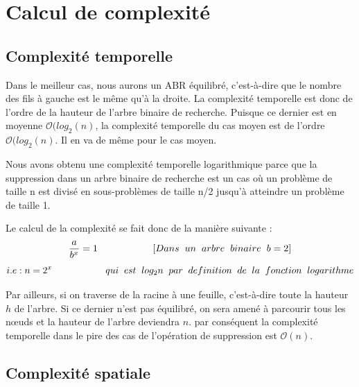\section{Calcul de complexité}
\subsection{Complexité temporelle}
Dans le meilleur cas, nous aurons un ABR équilibré, c’est-à-dire que le nombre des fils à gauche est le même qu’à la droite. La complexité temporelle est donc de l’ordre de la hauteur de l’arbre binaire de recherche. Puisque ce dernier est en moyenne $\mathcal{O}(log_2(n)$, la complexité temporelle du cas moyen est de l’ordre $\mathcal{O}(log_2(n)$. Il en va de même pour le cas moyen.
\par
Nous avons obtenu une complexité temporelle logarithmique parce que la suppression dans un arbre binaire de recherche est un cas où un problème de taille n est divisé en sous-problèmes de taille n/2 jusqu'à atteindre un problème de taille 1.
\par
Le calcul de la complexité se fait donc de la manière suivante :
$$ \frac {a}{b^x}=1  \hspace{2cm}[Dans\hspace{0.2cm} un\hspace{0.2cm} arbre\hspace{0.2cm} binaire\hspace{0.2cm} b = 2] $$
$$i.e : n=2^x\hspace{2cm} qui\hspace{0.2cm} est\hspace{0.2cm} log_2 n\hspace{0.2cm} par\hspace{0.2cm} definition\hspace{0.2cm} de\hspace{0.2cm} la\hspace{0.2cm} fonction\hspace{0.2cm} logarithme$$

\par
Par ailleurs, si on traverse de la racine à une feuille, c’est-à-dire toute la hauteur $h$ de l’arbre. Si ce dernier n’est pas équilibré, on sera amené à parcourir tous les nœuds et la hauteur de l’arbre deviendra $n$. par conséquent la complexité temporelle dans le pire des cas de l’opération de suppression est $\mathcal{O}(n)$.


\subsection{Complexité spatiale}

